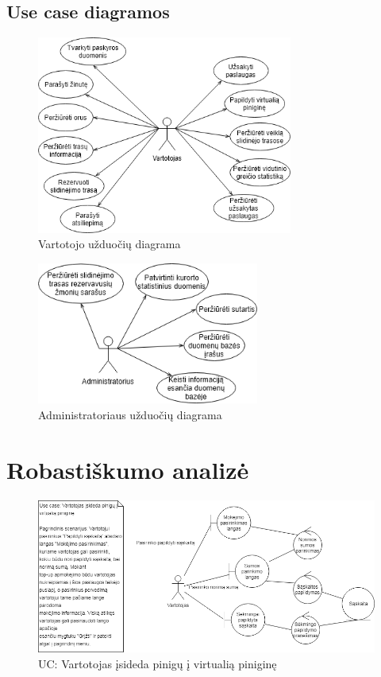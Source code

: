 \documentclass[oneside]{VUMIFPSkursinis}
\begin{document}
\subsection{Use case diagramos}
\begin{figure}[h]
    \centering
    \includegraphics[width=0.75\textwidth]{useCaseVartotojas.png}
    \caption{Vartotojo užduočių diagrama}
    \label{fig:VartotojoUseCasel}
\end{figure}
\vskip 1cm
\begin{figure}[h]
    \centering
    \includegraphics[width=0.65\textwidth]{useCaseAdministratorius.png}
    \caption{Administratoriaus užduočių diagrama}
    \label{fig:AdministratoriausUseCase}
\end{figure}

\break

\section{Robastiškumo analizė}
\begin{figure}[h]
    \centering
    \includegraphics[width=1.0\textwidth]{Rob1.png}
    \caption{UC: Vartotojas įsideda pinigų į virtualią piniginę}
    \label{fig:rob1}
\end{figure}
\vskip 1cm
\end{document}
